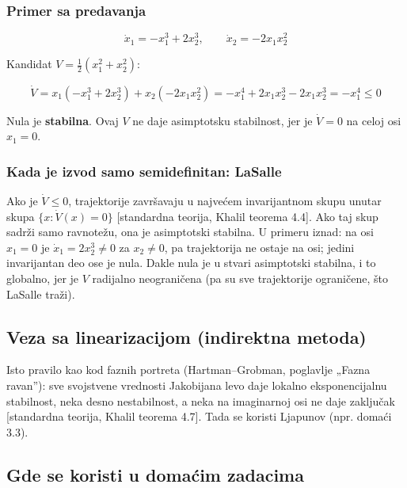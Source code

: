 \documentclass[11pt,a4paper,parskip=half,headsepline,numbers=noenddot]{scrartcl}
\DeclareRobustCommand{\izvor}[1]{{\small\color{izvorC}[#1]}}
\begin{document}
\subsubsection{Primer sa predavanja}

\[\dot x_1 = -x_1^3 + 2x_2^3, \qquad \dot x_2 = -2x_1x_2^2\]

Kandidat \(V = \frac12(x_1^2 + x_2^2)\):

\[\dot V = x_1(-x_1^3 + 2x_2^3) + x_2(-2x_1x_2^2) = -x_1^4 + 2x_1x_2^3 - 2x_1x_2^3 = -x_1^4 \le 0\]

Nula je \textbf{stabilna}. Ovaj \(V\) ne daje asimptotsku stabilnost, jer je \(\dot V = 0\) na celoj osi \(x_1 = 0\).

\subsubsection{Kada je izvod samo semidefinitan: LaSalle}

Ako je \(\dot V \le 0\), trajektorije završavaju u najvećem invarijantnom skupu unutar skupa \(\{x : \dot V(x) = 0\}\) \izvor{standardna teorija, Khalil teorema 4.4}. Ako taj skup sadrži samo ravnotežu, ona je asimptotski stabilna. U primeru iznad: na osi \(x_1 = 0\) je \(\dot x_1 = 2x_2^3 \ne 0\) za \(x_2 \ne 0\), pa trajektorija ne ostaje na osi; jedini invarijantan deo ose je nula. Dakle nula je u stvari asimptotski stabilna, i to globalno, jer je \(V\) radijalno neograničena (pa su sve trajektorije ograničene, što LaSalle traži).

\subsection{Veza sa linearizacijom (indirektna metoda)}

Isto pravilo kao kod faznih portreta (Hartman--Grobman, poglavlje „Fazna ravan''): sve svojstvene vrednosti Jakobijana levo daje lokalno eksponencijalnu stabilnost, neka desno nestabilnost, a neka na imaginarnoj osi ne daje zaključak \izvor{standardna teorija, Khalil teorema 4.7}. Tada se koristi Ljapunov (npr. domaći 3.3).

\subsection{Gde se koristi u domaćim zadacima}
\end{document}
